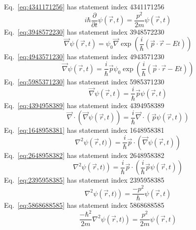 \documentclass[12pt]{report}
\begin{document}
Eq.~\ref{eq:4341171256} has statement index 4341171256
\begin{equation}
i \hbar \frac{\partial}{\partial t}\psi(\vec{r},t) = \frac{p^2}{2 m} \psi(\vec{r},t)
\label{eq:4341171256}
\end{equation}
Eq.~\ref{eq:3948572230} has statement index 3948572230
\begin{equation}
\vec{\nabla}\psi(\vec{r},t) = \psi_0 \vec{\nabla}\exp\left(\frac{i}{\hbar}\left(\vec{p}\cdot\vec{r} - E t \right) \right)
\label{eq:3948572230}
\end{equation}
Eq.~\ref{eq:4943571230} has statement index 4943571230
\begin{equation}
\vec{\nabla}\psi(\vec{r},t) = \frac{i}{\hbar} \vec{p} \psi_0 \exp\left(\frac{i}{\hbar}\left(\vec{p}\cdot\vec{r} - E t \right) \right)
\label{eq:4943571230}
\end{equation}
Eq.~\ref{eq:5985371230} has statement index 5985371230
\begin{equation}
\vec{\nabla}\psi(\vec{r},t) = \frac{i}{\hbar} \vec{p} \psi(\vec{r},t)
\label{eq:5985371230}
\end{equation}
Eq.~\ref{eq:4394958389} has statement index 4394958389
\begin{equation}
\vec{\nabla}\cdot \left(\vec{\nabla}\psi(\vec{r},t)\right) = \frac{i}{\hbar} \vec{\nabla}\cdot\left( \vec{p} \psi(\vec{r},t)\right)
\label{eq:4394958389}
\end{equation}
Eq.~\ref{eq:1648958381} has statement index 1648958381
\begin{equation}
\nabla^2 \psi\left(\vec{r},t)\right) = \frac{i}{\hbar} \vec{p} \cdot \left( \vec{\nabla}\psi(\vec{r},t)\right)
\label{eq:1648958381}
\end{equation}
Eq.~\ref{eq:2648958382} has statement index 2648958382
\begin{equation}
\nabla^2 \psi\left(\vec{r},t)\right) = \frac{i}{\hbar} \vec{p} \cdot \left( \frac{i}{\hbar} \vec{p}\psi(\vec{r},t)\right)
\label{eq:2648958382}
\end{equation}
Eq.~\ref{eq:2395958385} has statement index 2395958385
\begin{equation}
\nabla^2 \psi\left(\vec{r},t)\right) = \frac{-p^2}{\hbar} \psi(\vec{r},t)
\label{eq:2395958385}
\end{equation}
Eq.~\ref{eq:5868688585} has statement index 5868688585
\begin{equation}
\frac{-\hbar^2}{2m} \nabla^2 \psi\left(\vec{r},t)\right) = \frac{p^2}{2m} \psi(\vec{r},t)
\label{eq:5868688585}
\end{equation}
\end{document}
